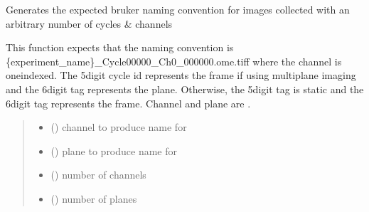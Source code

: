 \documentclass[letterpaper,10pt,english]{sphinxmanual}
\begin{document}

\begin{fulllineitems}
\label{\detokenize{CalSciPy.bruker:CalSciPy.bruker.generate_bruker_naming_convention}}
\pysigstartsignatures
{}
\pysigstopsignatures
\sphinxAtStartPar
Generates the expected bruker naming convention for images collected with an arbitrary number of cycles \& channels

\sphinxAtStartPar
This function expects that the naming convention is \{experiment\_name\}\_Cycle00000\_Ch0\_000000.ome.tiff
where the channel is one\sphinxhyphen{}indexed. The 5\sphinxhyphen{}digit cycle id represents the frame if using multiplane imaging and
the 6\sphinxhyphen{}digit tag represents the plane. Otherwise, the 5\sphinxhyphen{}digit tag is static and the 6\sphinxhyphen{}digit tag represents the frame.
Channel and plane are .
\begin{quote}\begin{description}
\begin{itemize}
\item {} 
\sphinxAtStartPar
{} () \textendash{} channel to produce name for

\item {} 
\sphinxAtStartPar
{} () \textendash{} plane to produce name for

\item {} 
\sphinxAtStartPar
{} () \textendash{} number of channels

\item {} 
\sphinxAtStartPar
{} () \textendash{} number of planes

\end{itemize}

\sphinxAtStartPar
{}

\sphinxAtStartPar


\end{description}\end{quote}

\end{fulllineitems}
\end{document}
